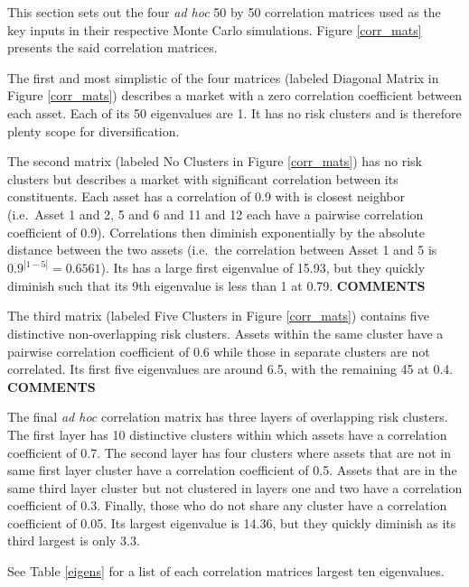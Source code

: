 \documentclass[11pt,preprint, authoryear]{elsarticle}
\numberwithin{equation}{section}
\numberwithin{figure}{section}
\numberwithin{table}{section}
\begin{document}
This section sets out the four \emph{ad hoc} 50 by 50 correlation
matrices used as the key inputs in their respective Monte Carlo
simulations. Figure \ref{corr_mats} presents the said correlation
matrices.

The first and most simplistic of the four matrices (labeled Diagonal
Matrix in Figure \ref{corr_mats}) describes a market with a zero
correlation coefficient between each asset. Each of its 50 eigenvalues
are 1. It has no risk clusters and is therefore plenty scope for
diversification.

The second matrix (labeled No Clusters in Figure \ref{corr_mats}) has no
risk clusters but describes a market with significant correlation
between its constituents. Each asset has a correlation of 0.9 with is
closest neighbor (i.e.~Asset 1 and 2, 5 and 6 and 11 and 12 each have a
pairwise correlation coefficient of 0.9). Correlations then diminish
exponentially by the absolute distance between the two assets (i.e.~the
correlation between Asset 1 and 5 is \(0.9^{|1-5|}=0.6561\)). Its has a
large first eigenvalue of 15.93, but they quickly diminish such that its
9th eigenvalue is less than 1 at 0.79. \textbf{COMMENTS}

The third matrix (labeled Five Clusters in Figure \ref{corr_mats})
contains five distinctive non-overlapping risk clusters. Assets within
the same cluster have a pairwise correlation coefficient of 0.6 while
those in separate clusters are not correlated. Its first five
eigenvalues are around 6.5, with the remaining 45 at 0.4.
\textbf{COMMENTS}

The final \emph{ad hoc} correlation matrix has three layers of
overlapping risk clusters. The first layer has 10 distinctive clusters
within which assets have a correlation coefficient of 0.7. The second
layer has four clusters where assets that are not in same first layer
cluster have a correlation coefficient of 0.5. Assets that are in the
same third layer cluster but not clustered in layers one and two have a
correlation coefficient of 0.3. Finally, those who do not share any
cluster have a correlation coefficient of 0.05. Its largest eigenvalue
is 14.36, but they quickly diminish as its third largest is only 3.3.

See Table \ref{eigens} for a list of each correlation matrices largest
ten eigenvalues.
\end{document}

